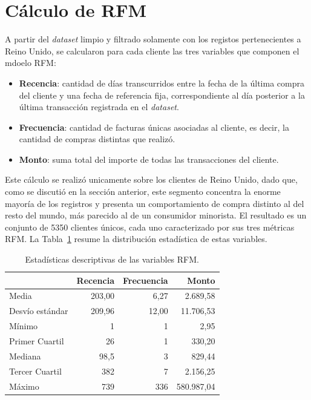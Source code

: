 \documentclass[a4paper,10pts,openany]{book}
\begin{document}
	
	
	\section{Cálculo de RFM}
	
	
	A partir del \emph{dataset} limpio y filtrado solamente con los registos pertenecientes a Reino Unido, se calcularon para cada cliente las tres variables que componen el mdoelo RFM:
	
	\begin{itemize}
		\item \textbf{Recencia}: cantidad de días transcurridos entre la fecha de la última compra del cliente y una fecha de referencia fija, correspondiente al día posterior a la última transacción registrada en el \emph{dataset}.
		\item \textbf{Frecuencia}: cantidad de facturas únicas asociadas al cliente, es decir, la cantidad de compras distintas que realizó.
		\item \textbf{Monto}: suma total del importe de todas las transacciones del cliente.
	\end{itemize}
	
	Este cálculo se realizó unicamente sobre los clientes de Reino Unido, dado que, como se discutió en la sección anterior, este segmento concentra la enorme mayoría de los registros y presenta un comportamiento de compra distinto al del resto del mundo, más parecido al de un consumidor minorista. El resultado es un conjunto de 5350 clientes únicos, cada uno caracterizado por sus tres métricas RFM. La Tabla~\ref{tab:estadisticas-rfm} resume la distribución estadística de estas variables.
	
	\begin{table}[H]
		\centering
		\caption{Estadísticas descriptivas de las variables RFM.}
		\label{tab:estadisticas-rfm}
		\begin{tabular}{lrrr}
			\toprule
			& Recencia & Frecuencia & Monto \\
			\midrule
			Media    & 203{,}00 & 6{,}27  & 2.689{,}58 \\
			Desvío estándar   & 209{,}96 & 12{,}00 & 11.706{,}53 \\
			Mínimo   & 1      & 1     & 2{,}95 \\
			Primer Cuartil     & 26     & 1     & 330{,}20 \\
			Mediana & 98{,}5 & 3   & 829{,}44 \\
			Tercer Cuartil     & 382    & 7     & 2.156{,}25 \\
			Máximo   & 739    & 336   & 580.987{,}04 \\
			\bottomrule
		\end{tabular}
	\end{table}
	
\end{document}
